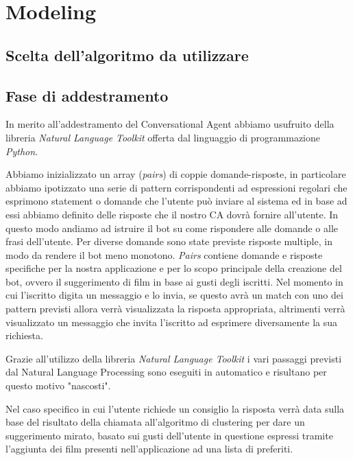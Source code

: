 \documentclass[a4paper, 10pt]{report}
\begin{document}
    \chapter{Modeling}\label{ch:modeling}


        \section{Scelta dell'algoritmo da utilizzare}\label{sec:scelta-dell'algoritmo-da-utilizzare}


        \section{Fase di addestramento}\label{sec:fase-di-addestramento}

        In merito all'addestramento del Conversational Agent abbiamo usufruito della libreria \textit{Natural Language Toolkit}
        offerta dal linguaggio di programmazione \textit{Python}.

        Abbiamo inizializzato un array (\textit{pairs}) di coppie domande-risposte, in particolare abbiamo ipotizzato una serie di pattern
        corrispondenti ad espressioni regolari che esprimono statement o domande che l'utente può inviare al sistema ed
        in base ad essi abbiamo definito delle risposte che il nostro CA dovrà fornire all'utente. In questo modo andiamo ad istruire il bot
        su come rispondere alle domande o alle frasi dell'utente. Per diverse domande sono state previste risposte multiple, in modo da rendere il bot meno monotono.
        \textit{Pairs} contiene domande e risposte specifiche per la nostra applicazione e per lo scopo
        principale della creazione del bot, ovvero il suggerimento di film in base ai gusti degli iscritti.
        Nel momento in cui l'iscritto digita un messaggio e lo invia, se questo avrà un match con uno dei pattern previsti allora
        verrà visualizzata la risposta appropriata, altrimenti verrà visualizzato un messaggio che invita l'iscritto
        ad esprimere diversamente la sua richiesta.

        Grazie all'utilizzo della libreria \textit{Natural Language Toolkit} i vari passaggi previsti dal Natural Language Processing
        sono eseguiti in automatico e risultano per questo motivo "nascosti".

        Nel caso specifico in cui l'utente richiede un consiglio la risposta verrà data sulla base del risultato della chiamata
        all'algoritmo di clustering per dare un suggerimento mirato, basato sui gusti dell'utente in questione espressi tramite
        l'aggiunta dei film presenti nell'applicazione ad una lista di preferiti.
\end{document}
